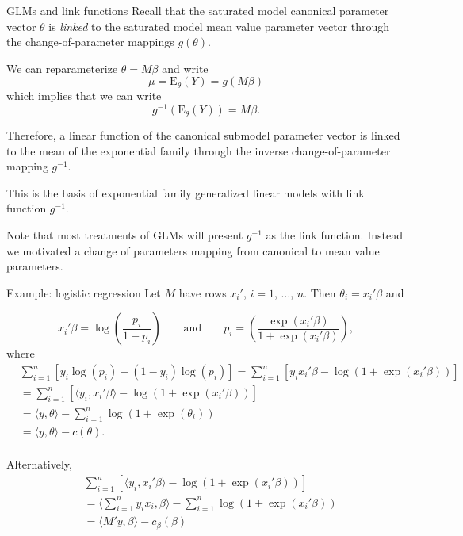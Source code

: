 \documentclass[
  ignorenonframetext,
]{beamer}
\begin{document}
\begin{frame}{GLMs and link functions}
\protect\hypertarget{glms-and-link-functions}{}
Recall that the saturated model canonical parameter vector \(\theta\) is
\emph{linked} to the saturated model mean value parameter vector through
the change-of-parameter mappings \(g(\theta)\).

We can reparameterize \(\theta = M\beta\) and write \[
 \mu = \text{E}_\theta(Y) = g(M\beta) 
\] which implies that we can write \[
  g^{-1}\left(\text{E}_\theta(Y)\right) = M\beta.
\]
\end{frame}

\begin{frame}{}
\protect\hypertarget{section-5}{}
Therefore, a linear function of the canonical submodel parameter vector
is linked to the mean of the exponential family through the inverse
change-of-parameter mapping \(g^{-1}\).

This is the basis of exponential family generalized linear models with
link function \(g^{-1}\).

Note that most treatments of GLMs will present \(g^{-1}\) as the link
function. Instead we motivated a change of parameters mapping from
canonical to mean value parameters.
\end{frame}

\begin{frame}{Example: logistic regression}
\protect\hypertarget{example-logistic-regression}{}
Let \(M\) have rows \(x_i'\), \(i = 1\), \(\ldots\), \(n\). Then
\(\theta_i = x_i'\beta\) and

\[
  x_i'\beta = \log\left(\frac{p_i}{1 - p_i}\right) \qquad \text{and} \qquad p_i = \left(\frac{\exp(x_i'\beta)}{ 1 + \exp(x_i'\beta)}\right),
\] where \begin{align*}
  &\sum_{i=1}^n\left[y_i\log(p_i) - (1 - y_i)\log(p_i) \right]
   = \sum_{i=1}^n\left[y_ix_i'\beta - \log(1 + \exp(x_i'\beta))\right] \\
    &= \sum_{i=1}^n\left[\langle y_i, x_i'\beta \rangle - \log(1 + \exp(x_i'\beta)) \right] \\
    &= \langle y, \theta \rangle - \sum_{i=1}^n \log(1 + \exp(\theta_i)) \\
    &= \langle y, \theta \rangle - c(\theta). \\
\end{align*}
\end{frame}

\begin{frame}{}
\protect\hypertarget{section-6}{}
Alternatively, \begin{align*}
  &\sum_{i=1}^n\left[\langle y_i, x_i'\beta \rangle - \log(1 + \exp(x_i'\beta)) \right] \\
  &= \langle \sum_{i=1}^n y_i x_i, \beta \rangle - \sum_{i=1}^n\log(1 + \exp(x_i'\beta)) \\
  &= \langle M'y, \beta \rangle - c_\beta(\beta)  
\end{align*}
\end{frame}
\end{document}
